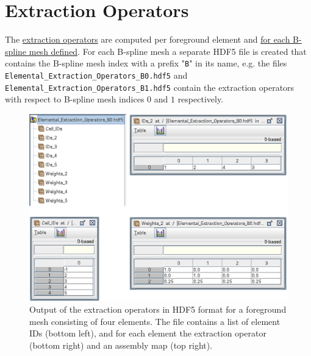 \section{Extraction Operators}
\label{sec:tutorial_extraction_ops}

The \hyperref[eq:extraction_operator]{extraction operators} are computed per foreground element and \hyperlink{bspline_mesh_definition}{for each B-spline mesh defined}. For each B-spline mesh a separate HDF5 file is created that contains the B-spline mesh index with a prefix "\texttt{B}" in its name, 
\newline e.g. the files \texttt{Elemental\_Extraction\_Operators\_B0.hdf5} and
\newline \texttt{Elemental\_Extraction\_Operators\_B1.hdf5} contain the extraction operators with respect to B-spline mesh indices $0$ and $1$ respectively.


\begin{figure}[h]
    \vspace{0.5cm}
    \begin{center}
    \includegraphics[width=12cm]{Figures/extraction_operator_output.png}
    \caption{Output of the extraction operators in HDF5 format for a foreground mesh consisting of four elements. The file contains a list of element IDs (bottom left), and for each element the extraction operator (bottom right) and an assembly map (top right).} 
    \label{fig:extraction_operator_output}
    \end{center}
\end{figure}

